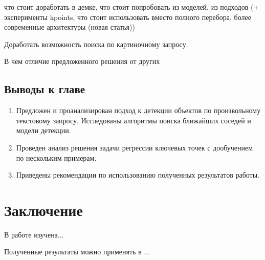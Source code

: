 \documentclass[a4paper,14pt]{article}
\begin{document}
    что стоит доработать в демке, что стоит попробовать из моделей, из подходов (+ эксперименты kpoints, что стоит использовать вместо полного перебора, более современные архитектуры (новая статья))
    
    Доработать возможность поиска по картиночному запросу.
    
    В чем отличие предложенного решения от других

    \subsection{Выводы к главе \thesection}
    \begin{enumerate}
        \itemsep0em
        \item Предложен и проанализирован подход к детекции объектов по произвольному текстовому запросу. Исследованы алгоритмы поиска ближайших соседей и модели детекции.
        \item Проведен анализ решения задачи регрессии ключевых точек с дообучением по нескольким примерам.
        \item Приведены рекомендации по использованию полученных результатов работы.
    \end{enumerate}

    \newpage


    \section{Заключение}

    В работе изучена...
    
    Полученные результаты можно применять в ...

    \newpage
    \renewcommand{\refname}{{\normalsize \hfill Список использованных источников \hfill}}
%    
    
    
    \newpage
\end{document}

